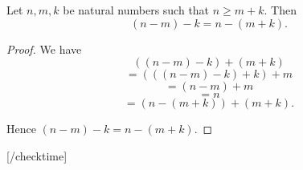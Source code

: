 \documentclass[10pt]{article}
\begin{document}
  \begin{forthel}
    [checktime 3]
    \begin{proposition}
      Let $n, m, k$ be natural numbers such that $n \geq  m + k$.
      Then \[ (n - m) - k = n - (m + k). \]
    \end{proposition}
    \begin{proof}
      We have
      \[  ((n - m) - k) + (m + k)       \]
      \[    = (((n - m) - k) + k) + m   \]
      \[    = (n - m) + m               \]
      \[    = n                         \]
      \[    = (n - (m + k)) + (m + k).  \]

      Hence $(n - m) - k = n - (m + k)$.
    \end{proof}
    [/checktime]
  \end{forthel}
\end{document}
